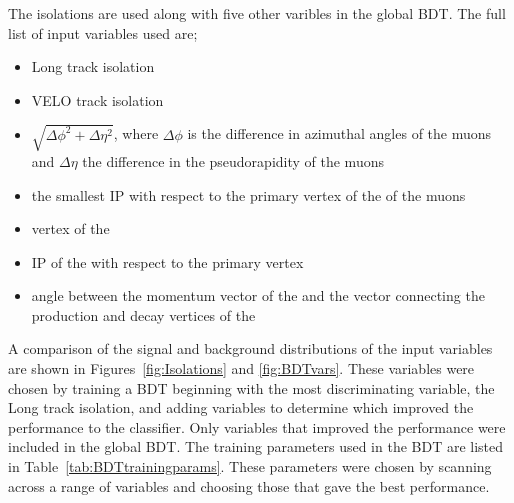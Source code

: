 The isolations are used along with five other varibles in the global BDT. The full list of input variables used are;
\begin{itemize}
\item Long track isolation
\item VELO track isolation
\item $\sqrt{\Delta \phi^{2} + \Delta \eta^{2}}$, where $\Delta \phi$ is the difference in azimuthal angles of the muons and $\Delta \eta$ the difference in the pseudorapidity of the muons
\item the smallest IP \chisqd with respect to the primary vertex of the \bsmumu of the muons
\item vertex \chisqd of the \bs
\item IP \chisqd of the \bs with respect to the primary vertex
\item angle between the momentum vector of the \bs and the vector connecting the production and decay vertices of the \bs
\end{itemize}

A comparison of the signal and background distributions of the input variables are shown in Figures~\ref{fig:Isolations} and \ref{fig:BDTvars}. These variables were chosen by training a BDT beginning with the most discriminating variable, the Long track isolation, and adding variables to determine which improved the performance to the classifier. Only variables that improved the performance were included in the global BDT. The training parameters used in the BDT are listed in Table~\ref{tab:BDTtrainingparams}. These parameters were chosen by scanning across a range of variables and choosing those that gave the best performance. 

